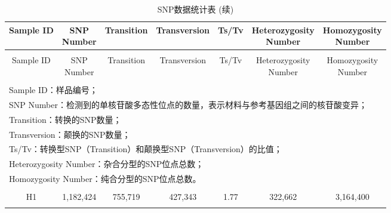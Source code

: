 \documentclass[
  a4paper,
  titlepage]{article}
\begin{document}
\begin{longtable}[t]{ccccccc}
\caption{\label{tab:snpstat-table}SNP数据统计表}\\
\toprule
Sample ID & \makecell[c]{SNP\\Number} & Transition & Transversion & Ts/Tv & \makecell[c]{Heterozygosity\\Number} & \makecell[c]{Homozygosity\\Number}\\
\midrule
\endfirsthead
\caption[]{\label{tab:snpstat-table}SNP数据统计表 (续)}\\
\toprule
Sample ID & \makecell[c]{SNP\\Number} & Transition & Transversion & Ts/Tv & \makecell[c]{Heterozygosity\\Number} & \makecell[c]{Homozygosity\\Number}\\
\midrule
\endhead
\hline
\endfoot
\bottomrule
\multicolumn{7}{l}{\rule{0pt}{1em}\textit{注：}}\\
\multicolumn{7}{l}{\rule{0pt}{1em}Sample ID：样品编号；}\\
\multicolumn{7}{l}{\rule{0pt}{1em}SNP Number：检测到的单核苷酸多态性位点的数量，表示材料与参考基因组之间的核苷酸变异；}\\
\multicolumn{7}{l}{\rule{0pt}{1em}Transition：转换的SNP数量；}\\
\multicolumn{7}{l}{\rule{0pt}{1em}Transversion：颠换的SNP数量；}\\
\multicolumn{7}{l}{\rule{0pt}{1em}Ts/Tv：转换型SNP（Transition）和颠换型SNP（Transversion）的比值；}\\
\multicolumn{7}{l}{\rule{0pt}{1em}Heterozygosity Number：杂合分型的SNP位点总数；}\\
\multicolumn{7}{l}{\rule{0pt}{1em}Homozygosity Number：纯合分型的SNP位点总数。}\\
\endlastfoot
\cellcolor{gray!6}{FJMS} & \cellcolor{gray!6}{2,897,610} & \cellcolor{gray!6}{1,854,989} & \cellcolor{gray!6}{1,046,838} & \cellcolor{gray!6}{1.77} & \cellcolor{gray!6}{2,085,117} & \cellcolor{gray!6}{2,600,923}\\
 
H1 & 1,182,424 & 755,719 & 427,343 & 1.77 & 322,662 & 3,164,400\\
 
\cellcolor{gray!6}{H3} & \cellcolor{gray!6}{898,920} & \cellcolor{gray!6}{575,697} & \cellcolor{gray!6}{323,611} & \cellcolor{gray!6}{1.78} & \cellcolor{gray!6}{236,228} & \cellcolor{gray!6}{2,739,714}\\
 

\end{longtable}
\end{document}

